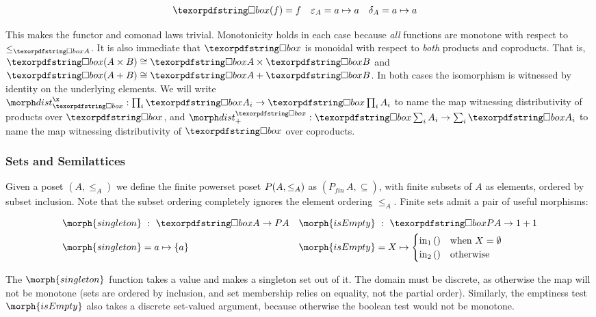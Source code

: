 \begin{align*}
  \iso(f) &= f & \varepsilon_A &= a \mapsto a & \delta_A &= a \mapsto a
\end{align*}

\noindent
This makes the functor and comonad laws trivial. Monotonicity holds in each case because \emph{all} functions are monotone with respect to $\le_{\iso A}$.
%
It is also immediate that $\iso$ is monoidal with respect to \emph{both}
products and coproducts. That is, $\iso (A \times B) \cong \iso A \times \iso B$
and $\iso (A + B) \cong \iso A + \iso B$.
%
In both cases the isomorphism is witnessed by identity on the underlying
elements.
%
We will write $\isox : \prod_i \iso A_i \to \iso\prod_i A_i$ to name the map
witnessing distributivity of products over $\iso$, and $\isosum : \iso \sum_i
A_i \to \sum_i \iso A_i$ to name the map witnessing distributivity of $\iso$
over coproducts.


\subsubsection{Sets and Semilattices}

Given a poset $(A, \leq_A)$ we define the finite powerset poset $P (A,
\leq_A)$ as $(P_{\textit{fin}}\, A, \subseteq)$, with finite subsets of $A$ as
elements, ordered by subset inclusion.
%
Note that the subset ordering completely ignores the element ordering $\leq_A$.
%
Finite sets admit a pair of useful morphisms:

\begin{align*}
  \morph{singleton} &\isa \iso A \to \pfinof A
  &
  \morph{isEmpty} &\isa \iso \pfinof A \to \termO + \termO
  \\
  \morph{singleton} &= a \mapsto \{a\}
  &
  \morph{isEmpty} &= X \mapsto 
  \begin{cases}
    \inj 1 () &\text{when }X = \emptyset\\
    \inj 2 () &\text{otherwise}
  \end{cases}
\end{align*}

\noindent
The $\morph{singleton}$ function takes a value and makes a singleton set out of
it. The domain must be discrete, as otherwise the map will not be monotone (sets
are ordered by inclusion, and set membership relies on equality, not the partial
order). Similarly, the emptiness test $\morph{isEmpty}$ also takes a discrete
set-valued argument, because otherwise the boolean test would not be monotone.


